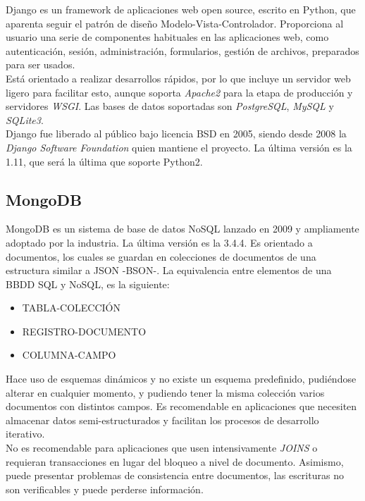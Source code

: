 Django es un framework de aplicaciones web open source, escrito en Python, que aparenta seguir el patrón de diseño Modelo-Vista-Controlador. Proporciona al usuario una serie de componentes habituales en las aplicaciones web, como autenticación, sesión, administración, formularios, gestión de archivos, preparados para ser usados.\\


Está orientado a realizar desarrollos rápidos, por lo que incluye un servidor web ligero para facilitar esto, aunque soporta \textit{Apache2} para la etapa de producción y servidores \textit{WSGI}. Las bases de datos soportadas son \textit{PostgreSQL}, \textit{MySQL} y \textit{SQLite3}.\\


Django fue liberado al público bajo licencia BSD en 2005, siendo desde 2008 la \textit{Django Software Foundation} quien mantiene el proyecto. La última versión es la 1.11, que será la última que soporte Python2.


\subsection{MongoDB} 
\label{sec:mongodb}


MongoDB es un sistema de base de datos NoSQL lanzado en 2009 y ampliamente adoptado por la industria. La última versión es la 3.4.4. Es orientado a documentos, los cuales se guardan en colecciones de documentos de una estructura similar a JSON -BSON-.  La equivalencia entre elementos de una BBDD SQL y NoSQL, es la siguiente:\\

\begin{itemize}
\item TABLA-COLECCIÓN

\item REGISTRO-DOCUMENTO

\item COLUMNA-CAMPO
\end{itemize}


Hace uso de esquemas dinámicos y no existe un esquema predefinido, pudiéndose alterar en cualquier momento, y pudiendo tener la misma colección varios documentos con distintos campos. Es recomendable en aplicaciones que necesiten almacenar datos semi-estructurados y facilitan los procesos de desarrollo iterativo.\\


No es recomendable para aplicaciones que usen intensivamente \textit{JOINS} o requieran transacciones en lugar del bloqueo a nivel de documento. Asimismo, puede presentar problemas de consistencia entre documentos, las escrituras no son verificables y puede perderse información.\\


